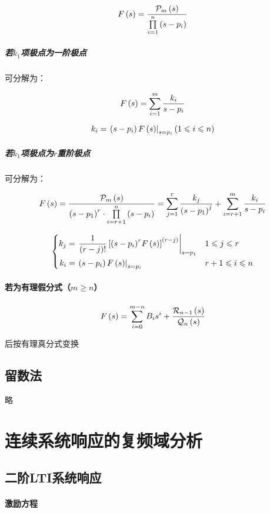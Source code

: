 \documentclass{article}
\begin{document}
\[F\left(s\right)=\frac{\mathcal P_m\left(s\right)}{\prod\limits_{i=1}^n\left(s-p_i\right)}\]

\subparagraph{若$k_1$项极点为一阶极点}

可分解为：

\[F\left(s\right)=\sum_{i=1}^m\frac{k_i}{s-p_i}\]

\[k_i=\left.\left(s-p_i\right)F\left(s\right)\right|_{s=p_i}\left(1\leqslant i\leqslant n\right)\]

\subparagraph{若$k_1$项极点为$r$重阶极点}

可分解为：

\[F\left(s\right)=\frac{\mathcal P_m\left(s\right)}{{\left(s-p_1\right)}^r\cdot\prod\limits_{i=r+1}^n\left(s-p_i\right)}
    =\sum_{j=1}^r\frac{k_j}{{\left(s-p_1\right)}^j}+\sum_{i=r+1}^m\frac{k_i}{s-p_i}\]

\[\left\{\begin{aligned}
        k_j & =\left.\frac1{\left(r-j\right)!}\left[{\left(s-p_i\right)}^rF\left(s\right)\right]^{\left(r-j\right)}\right|_{s=p_1} &  & 1\leqslant j\leqslant r   \\
        k_i & =\left.\left(s-p_i\right)F\left(s\right)\right|_{s=p_i}                                                  &  & r+1\leqslant i\leqslant n
    \end{aligned}\right.\]

\paragraph{若为有理假分式（$m\geqslant n$）}

\[F\left(s\right)=\sum_{i=0}^{m-n}B_is^i+\frac{\mathcal R_{n-1}\left(s\right)}{\mathcal Q_n\left(s\right)}\]

后按有理真分式变换

\subsection{留数法}

略

\section{连续系统响应的复频域分析}

\subsection{二阶LTI系统响应}

\paragraph{激励方程}
\end{document}
